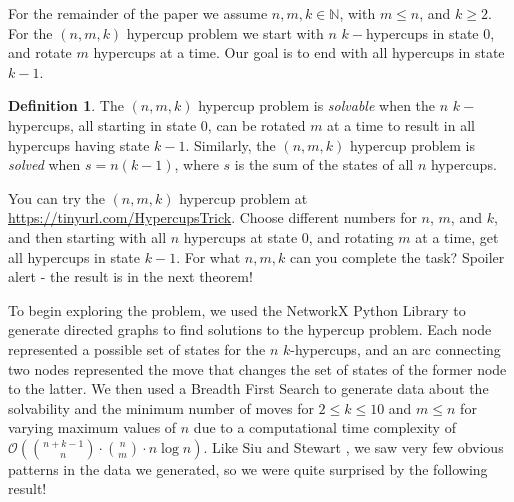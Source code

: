 \documentclass{article}
\theoremstyle{theorem}
\theoremstyle{definition}
\newtheorem*{definition}{Definition}
\begin{document}
For the remainder of the paper we assume $n,m,k\in\mathbb{N}$, with $m\le n$, and $k\ge 2$. For the $(n,m,k)$ hypercup problem we start with $n$ $k-$hypercups in state $0$, and rotate $m$ hypercups at a time. Our goal is to end with all hypercups in state $k-1$. 

\begin{definition}\label{def:solved}
    The $(n,m,k)$ hypercup problem is \textit{solvable} when the $n$ $k-$hypercups, all starting in state $0$, can be rotated $m$ at a time to result in all hypercups having state $k-1$. Similarly, the $(n,m,k)$ hypercup problem is \textit{solved} when $s=n(k-1)$, where $s$ is the sum of the states of all $n$ hypercups.
\end{definition}

You can try the $(n,m,k)$ hypercup problem at \url{https://tinyurl.com/HypercupsTrick}. Choose different numbers for $n$, $m$, and $k$, and then starting with all $n$ hypercups at state $0$, and rotating $m$ at a time, get all hypercups in state $k-1$. For what $n,m,k$ can you complete the task? Spoiler alert - the result is in the next theorem!


To begin exploring the problem, we used the NetworkX Python Library \cite{NetworkX} to generate directed graphs to find solutions to the hypercup problem. Each node represented a possible set of states for the $n$ $k$-hypercups, and an arc connecting two nodes represented the move that changes the set of states of the former node to the latter. We then used a Breadth First Search to generate data about the solvability and the minimum number of moves for $2\le k\le 10$ and $m\le n$ for varying maximum values of $n$ due to a computational time complexity of $\mathcal{O}\left(\binom{n+k-1}{n} \cdot \binom{n}{m} \cdot n \log n\right)$. Like Siu and Stewart \cite{SS10}, we saw very few obvious patterns in the data we generated, so we were quite surprised by the following result!



\end{document}
